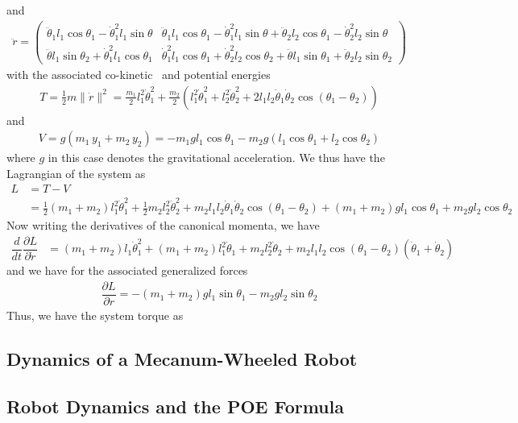 %
and
%
\begin{align}
\ddot{r} = \left(\begin{array}{c|c}
\ddot{\theta}_1 l_1 \cos \theta_1 - \dot{\theta}_1^2 l_1 \sin \theta  & \ddot{\theta}_1 l_1 \cos \theta_1 - \dot{\theta}_1^2 l_1 \sin \theta  + \ddot{\theta}_2 l_2 \cos \theta_1 - \dot{\theta}_2^2 l_2 \sin \theta
\\
\ddot{\theta} l_1  \sin \theta_2 + \dot{\theta}_1^2 l_1 \cos \theta_1  & 
\dot{\theta}_1^2 l_1 \cos \theta_1  + \dot{\theta}_2^2 l_2 \cos \theta_2  + \ddot{\theta}l_1 \sin \theta_1 + \ddot{\theta}_2 l_2 \sin \theta_2 
\end{array}\right)
\end{align}
%
with the associated co-kinetic~\cite{Stramigioli2001} and potential energies
%
\begin{align}
	T = \frac{1}{2} m \|\dot{r}\|^2 = \frac{m_1}{2}l_1^2 \dot{\theta}_1^2 + \frac{m_2}{2}\left(l_1^2 \dot{\theta}_1^2 + l_2^2 \dot{\theta}_2^2 + 2 l_1 l_2 \dot{\theta}_1 \dot{\theta}_2 \cos(\theta_1 - \theta_2) \right)
\end{align}
%
and
%
\begin{align}
	V = g(m_1 \, y_1 + m_2\, y_2) = -m_1gl_1 \cos \theta_1 - m_2 g \left(l_1 \cos \theta_1 + l_2 \cos \theta_2\right)
\end{align}
%
where $g$ in this case denotes the gravitational acceleration.
%
We thus have the Lagrangian of the system as 
%
\begin{align}
	L & = T - V \nonumber \\
	  & = \frac{1}{2}(m_1 + m_2)l_1^2 \dot{\theta}_1^2 + \frac{1}{2}m_2 l_2^2 \dot{\theta}_2^2 + m_2l_1 l_2 \dot{\theta}_1 \dot{\theta}_2 \cos(\theta_1 - \theta_2) + (m_1 + m_2) g l_1 \cos \theta_1 + m_2 g l_2 \cos \theta_2 
\end{align}
%
Now writing the derivatives of the canonical momenta, we have
%
\begin{align}
\dfrac{d}{dt}\dfrac{\partial L}{\partial \dot{r}} &=  (m_1+m_2)l_1 \dot{\theta}_1^2 + (m_1+m_2)l_1^2 \dot{\theta}_1 + m_2 l_2^2 \dot{\theta}_2 + m_2 l_1 l_2 \cos(\theta_1 - \theta_2)(\dot{\theta}_1 + \dot{\theta}_2) 
\end{align}
%
and we have for the associated generalized forces
%
\begin{align}
\dfrac{\partial L}{\partial r} =  %
  - (m_1 + m_2) g l_1 \sin \theta_1 - m_2 g l_2 \sin \theta_2
\end{align}
%
Thus, we have the system torque as 



\subsection{Dynamics of a Mecanum-Wheeled Robot}

\subsection{Robot Dynamics and the POE Formula}



